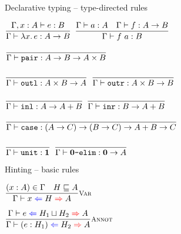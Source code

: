 \documentclass{beamer}
\begin{document}
\begin{frame}{Declarative typing -- type-directed rules}

\begin{center}
  $\infrule{\typing[\extend{\Gamma}{x}{A}]{e}{B}}{\typing{\fun{x}{e}}{\Fun{A}{B}}}$ \quad
  $\infrule{\typing{a}{A} \quad \typing{f}{\Fun{A}{B}}}{\typing{\app{f}{a}}{B}}$

  \vspace{2em}

  $\infrule{}{\typing{\pairfun}{\Fun{A}{\Fun{B}{\Prod{A}{B}}}}}$

  \vspace{1em}

  $\infrule{}{\typing{\outlfun}{\Fun{\Prod{A}{B}}{A}}}$ \quad
  $\infrule{}{\typing{\outrfun}{\Fun{\Prod{A}{B}}{B}}}$

  \vspace{2em}

  $\infrule{}{\typing{\inlfun}{\Fun{A}{\Sum{A}{B}}}}$ \quad
  $\infrule{}{\typing{\inrfun}{\Fun{B}{\Sum{A}{B}}}}$

  \vspace{2em}

  $\infrule{}{\typing{\casefun}{\Fun{(\Fun{A}{C})}{\Fun{(\Fun{B}{C})}{\Fun{\Sum{A}{B}}{C}}}}}$

  \vspace{2em}

  $\infrule{}{\typing{\unit}{\Unit}}$ \quad
  $\infrule{}{\typing{\emptyelimfun}{\Fun{\Empty}{A}}}$
\end{center}

\end{frame}

\begin{frame}{Hinting -- basic rules}

\begin{center}
  $\infrule[Var]{\sidecond{(x : A) \in \Gamma} \quad \sidecond{\hintorder{H}{A}}}{\hinting{x}{H}{A}}$

  \vspace{2em}

  $\infrule[Annot]{\hinting{e}{\hintlub{H_1}{H_2}}{A}}{\hinting{\annot{e}{H_1}}{H_2}{A}}$
\end{center}

\end{frame}
\end{document}
